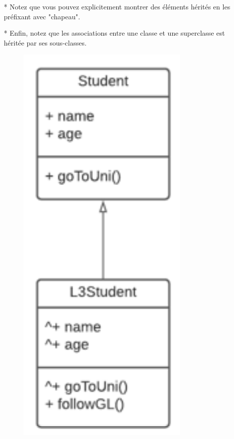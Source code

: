 \documentclass[12pt]{article}
\begin{document}
\begin{itemize}
\begin{figure}[!hbtp]
		\end{figure}
	\item[* ] Notez que vous pouvez explicitement montrer des éléments hérités
	en les préfixant avec "chapeau".
	\item[* ] Enfin, notez que les associations entre une classe et une
	superclasse est héritée par ses sous-classes.
		\begin{figure}[!hbtp]
		\centering
		\includegraphics[scale=0.75]{Capture2.PNG}
	\end{figure}
	\end{itemize}
\end{document}
